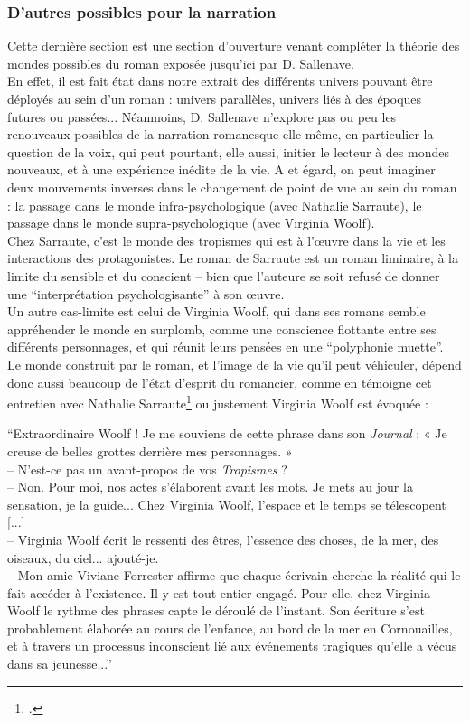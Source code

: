 \documentclass[a4paper,10pt]{article}
\begin{document}
		\subsubsection{D'autres possibles pour la narration}
			Cette dernière section est une section d'ouverture venant compléter la théorie des mondes possibles du roman exposée jusqu'ici par D. Sallenave.\\
			En effet, il est fait état dans notre extrait des différents univers pouvant être déployés au sein d'un roman : univers parallèles, univers liés à des époques futures ou passées... Néanmoins, D. Sallenave n'explore pas ou peu les renouveaux possibles de la narration romanesque elle-même, en particulier la question de la voix, qui peut pourtant, elle aussi, initier le lecteur à des mondes nouveaux, et à une expérience inédite de la vie. A et égard, on peut imaginer deux mouvements inverses dans le changement de point de vue au sein du roman : la passage dans le monde infra-psychologique (avec Nathalie Sarraute), le passage dans le monde supra-psychologique (avec Virginia Woolf).\\
			Chez Sarraute, c'est le monde des tropismes qui est à l'œuvre dans la vie et les interactions des protagonistes. Le roman de Sarraute est un roman liminaire, à la limite du sensible et du conscient -- bien que l'auteure se soit refusé de donner une ``interprétation psychologisante'' à son œuvre.\\
			Un autre cas-limite est celui de Virginia Woolf, qui dans ses romans semble appréhender le monde en surplomb, comme une conscience flottante entre ses différents personnages, et qui réunit leurs pensées en une ``polyphonie muette''.\\
			Le monde construit par le roman, et l'image de la vie qu'il peut véhiculer, dépend donc aussi beaucoup de l'état d'esprit du romancier, comme en témoigne cet entretien avec Nathalie Sarraute\footcite{Causse2016} ou justement Virginia Woolf est évoquée :
			\begin{center}
				\footnotesize
				\begin{minipage}{0.7\textwidth}
					``Extraordinaire Woolf ! Je me souviens de cette phrase dans son \textit{Journal} : « Je creuse de belles grottes derrière mes personnages. »\\
					-- N’est-ce pas un avant-propos de vos \textit{Tropismes} ?\\
					-- Non. Pour moi, nos actes s’élaborent avant les mots. Je mets au jour la sensation, je la guide... Chez Virginia Woolf, l’espace et le temps se télescopent [...]\\
					-- Virginia Woolf écrit le ressenti des êtres, l’essence des choses, de la mer, des oiseaux, du ciel... ajouté-je.\\
					-- Mon amie Viviane Forrester affirme que chaque écrivain cherche la réalité qui le fait accéder à l’existence. Il y est tout entier engagé. Pour elle, chez Virginia Woolf le rythme des phrases capte le déroulé de l’instant. Son écriture s’est probablement élaborée au cours de l’enfance, au bord de la mer en Cornouailles, et à travers un processus inconscient lié aux événements tragiques qu’elle a vécus dans sa jeunesse...''
				\end{minipage}
			\end{center}
\end{document}
